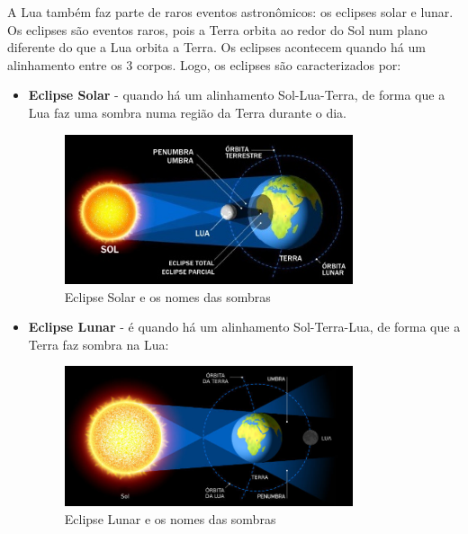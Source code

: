 \documentclass[12pt]{extarticle}
\newcommand{\<}{\langle}
\renewcommand{\>}{\rangle}
\theoremstyle{definition}
\begin{document}
A Lua também faz parte de raros eventos astronômicos: os eclipses solar e lunar. Os eclipses são eventos raros, pois a Terra orbita ao redor do Sol num plano diferente do que a Lua orbita a Terra. Os eclipses acontecem quando há um alinhamento entre os 3 corpos. Logo, os eclipses são caracterizados por:
\begin{itemize}
    \item \textbf{Eclipse Solar} - quando há um alinhamento Sol-Lua-Terra, de forma que a Lua faz uma sombra numa região da Terra durante o dia.
    
    \begin{figure}[H]
        \centering
        \includegraphics[width=0.8\textwidth]{esquema-do-eclipse-solar.jpg}
        \caption{Eclipse Solar e os nomes das sombras}
        \label{fig:solar_eclipse}
    \end{figure}
    
    \item \textbf{Eclipse Lunar} - é quando há um alinhamento Sol-Terra-Lua, de forma que a Terra faz sombra na Lua:
    \begin{figure}[H]
        \centering
        \includegraphics[width=0.8\textwidth]{esquema-eclipse-lunar.jpg}
        \caption{Eclipse Lunar e os nomes das sombras}
        \label{fig:lunar_eclipse}
    \end{figure}
\end{itemize}
\end{document}
